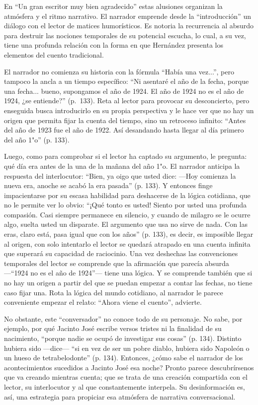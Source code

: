 \documentclass[14pt,twoside,final]{extbook} %
\begin{document}
En ``Un gran escritor muy bien agradecido'' estas alusiones organizan la atmósfera y el ritmo narrativo. El narrador emprende desde la ``introducción'' un diálogo con el lector de matices humorísticos. Es notoria la recurrencia al absurdo para destruir las nociones temporales de su potencial escucha, lo cual, a su vez, tiene una profunda relación con la forma en que Hernández presenta los elementos del cuento tradicional.

El narrador no comienza su historia con la fórmula ``Había una vez...'', pero tampoco la ancla a un tiempo específico: ``Ni asentaré el año de la fecha, porque una fecha... bueno, supongamos el año de 1924. El año de 1924 no es el año de 1924, ¿se entiende?'' (p.~133). Reta al lector para provocar su
desconcierto, pero enseguida busca introducirlo en su propia perspectiva y le hace ver que no hay un origen que permita fijar la cuenta del tiempo, sino un retroceso infinito: ``Antes del año de 1923 fue el año de 1922. Así desandando hasta llegar al día primero del año 1"o'' (p. 133).

Luego, como para comprobar si el lector ha captado su argumento, le pregunta: qué día era antes de la una de la mañana del año 1"o. El narrador anticipa la respuesta del interlocutor: ``Bien, ya oigo que usted dice: ---Hoy comienza la nueva era, anoche se acabó la era pasada'' (p. 133). Y entonces finge impacientarse por su escasa habilidad para deshacerse de la lógica cotidiana, que no le permite ver lo obvio: ``¡Qué tonto es usted! Siento por usted una profunda compasión. Casi siempre permanece en silencio, y cuando de milagro se le ocurre algo, suelta usted un disparate. El argumento que usa no sirve de nada. Con las eras, claro está, pasa igual que con los años'' (p. 133), es decir, es imposible llegar al origen, con solo intentarlo el lector se quedará atrapado en una cuenta infinita que superará su capacidad de raciocinio. Una vez deshechas las convenciones temporales del lector se comprende que la afirmación que parecía absurda ---``1924 no es el año de 1924''--- tiene una lógica. Y se comprende también que si no hay un origen a partir del que se puedan empezar a contar las fechas, no tiene caso fijar una. Rota la lógica del mundo cotidiano, al narrador le parece conveniente empezar el relato: ``Ahora viene el cuento'', advierte.

No obstante, este ``conversador'' no conoce todo de su personaje. No sabe, por ejemplo, por qué Jacinto José escribe versos tristes ni la finalidad de su nacimiento, ``porque nadie se ocupó de investigar sus cosas'' (p. 134). Distinto hubiera sido ---dice--- ``si en vez de ser un pobre diablo, hubiera sido Napoleón o un hueso de tetrabelodonte'' (p. 134). Entonces, ¿cómo sabe el narrador de los acontecimientos sucedidos a Jacinto José esa noche? Pronto parece descubrírsenos que va creando mientras cuenta; que se trata de una creación compartida con el lector, su interlocutor y al que constantemente interpela. Su desinformación es, así, una estrategia para propiciar esa atmósfera de narrativa conversacional.
\end{document}
